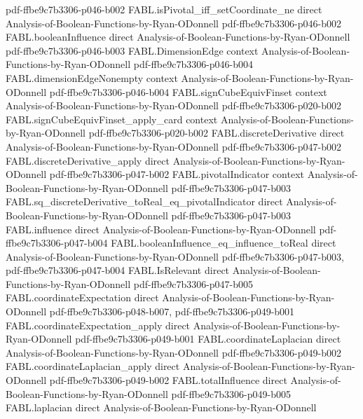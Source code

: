 \begin{theorem}
  {pdf-ffbe9c7b3306-p046-b002}
\proofstep
  {FABL.isPivotal_iff_setCoordinate_ne}
  {direct}
  {Analysis-of-Boolean-Functions-by-Ryan-ODonnell}
  {pdf-ffbe9c7b3306-p046-b002}
\proofstep
  {FABL.booleanInfluence}
  {direct}
  {Analysis-of-Boolean-Functions-by-Ryan-ODonnell}
  {pdf-ffbe9c7b3306-p046-b003}
\proofstep
  {FABL.DimensionEdge}
  {context}
  {Analysis-of-Boolean-Functions-by-Ryan-ODonnell}
  {pdf-ffbe9c7b3306-p046-b004}
\proofstep
  {FABL.dimensionEdgeNonempty}
  {context}
  {Analysis-of-Boolean-Functions-by-Ryan-ODonnell}
  {pdf-ffbe9c7b3306-p046-b004}
\proofstep
  {FABL.signCubeEquivFinset}
  {context}
  {Analysis-of-Boolean-Functions-by-Ryan-ODonnell}
  {pdf-ffbe9c7b3306-p020-b002}
\proofstep
  {FABL.signCubeEquivFinset_apply_card}
  {context}
  {Analysis-of-Boolean-Functions-by-Ryan-ODonnell}
  {pdf-ffbe9c7b3306-p020-b002}
\proofstep
  {FABL.discreteDerivative}
  {direct}
  {Analysis-of-Boolean-Functions-by-Ryan-ODonnell}
  {pdf-ffbe9c7b3306-p047-b002}
\proofstep
  {FABL.discreteDerivative_apply}
  {direct}
  {Analysis-of-Boolean-Functions-by-Ryan-ODonnell}
  {pdf-ffbe9c7b3306-p047-b002}
\proofstep
  {FABL.pivotalIndicator}
  {context}
  {Analysis-of-Boolean-Functions-by-Ryan-ODonnell}
  {pdf-ffbe9c7b3306-p047-b003}
\proofstep
  {FABL.sq_discreteDerivative_toReal_eq_pivotalIndicator}
  {direct}
  {Analysis-of-Boolean-Functions-by-Ryan-ODonnell}
  {pdf-ffbe9c7b3306-p047-b003}
\proofstep
  {FABL.influence}
  {direct}
  {Analysis-of-Boolean-Functions-by-Ryan-ODonnell}
  {pdf-ffbe9c7b3306-p047-b004}
\proofstep
  {FABL.booleanInfluence_eq_influence_toReal}
  {direct}
  {Analysis-of-Boolean-Functions-by-Ryan-ODonnell}
  {pdf-ffbe9c7b3306-p047-b003,
    pdf-ffbe9c7b3306-p047-b004}
\proofstep
  {FABL.IsRelevant}
  {direct}
  {Analysis-of-Boolean-Functions-by-Ryan-ODonnell}
  {pdf-ffbe9c7b3306-p047-b005}
\proofstep
  {FABL.coordinateExpectation}
  {direct}
  {Analysis-of-Boolean-Functions-by-Ryan-ODonnell}
  {pdf-ffbe9c7b3306-p048-b007,
    pdf-ffbe9c7b3306-p049-b001}
\proofstep
  {FABL.coordinateExpectation_apply}
  {direct}
  {Analysis-of-Boolean-Functions-by-Ryan-ODonnell}
  {pdf-ffbe9c7b3306-p049-b001}
\proofstep
  {FABL.coordinateLaplacian}
  {direct}
  {Analysis-of-Boolean-Functions-by-Ryan-ODonnell}
  {pdf-ffbe9c7b3306-p049-b002}
\proofstep
  {FABL.coordinateLaplacian_apply}
  {direct}
  {Analysis-of-Boolean-Functions-by-Ryan-ODonnell}
  {pdf-ffbe9c7b3306-p049-b002}
\proofstep
  {FABL.totalInfluence}
  {direct}
  {Analysis-of-Boolean-Functions-by-Ryan-ODonnell}
  {pdf-ffbe9c7b3306-p049-b005}
\proofstep
  {FABL.laplacian}
  {direct}
  {Analysis-of-Boolean-Functions-by-Ryan-ODonnell}

\end{theorem}
